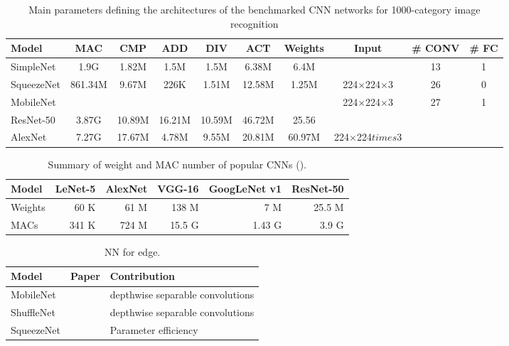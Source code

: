 \begin{table}
\renewcommand{\arraystretch}{.75}
\small
\centering
\caption{Main parameters defining the architectures of the benchmarked CNN networks for 1000-category image recognition \cite{Montero2018}\cite{Hasanpour2016}}
\begin{tabular}{lccccccccc}
\toprule
\textbf{Model}	&	\textbf{MAC}	&	\textbf{CMP}	&	\textbf{ADD}	&	\textbf{DIV}	&	\textbf{ACT}	&	\textbf{Weights}	&	\textbf{Input}	&	\textbf{\# CONV}	&	\textbf{\# FC}	\\
\midrule
SimpleNet	&	1.9G	&	1.82M	&	1.5M	&	1.5M	&	6.38M	&	6.4M	&		&	13	&	1 \\
SqueezeNet	&861.34M	&	9.67M	&	226K	&	1.51M	&	12.58M	&	1.25M	&	224$\times$224$\times$3 &	26	&	0	\\
MobileNet	&			&			&			&			&			&			&	224$\times$224$\times$3	&	27	&	1	\\
ResNet-50	&	3.87G	&	10.89M	&	16.21M	&	10.59M	&	46.72M	&	25.56&	\\
AlexNet		&	7.27G	&	17.67M	&	4.78M	&	9.55M	&	20.81M	&	60.97M	&	224$\times$224$
times$3 \\
\bottomrule
\end{tabular}
\end{table}



\begin{table}
\renewcommand{\arraystretch}{.75}
\centering
\caption{ Summary of weight and MAC number of popular CNNs (\cite{Sze2017}).}
\begin{tabular}{lrrrrr}
\toprule
\textbf{Model} & \textbf{LeNet-5} &  \textbf{AlexNet} & \textbf{VGG-16} & \textbf{GoogLeNet v1} & \textbf{ResNet-50} \\
\midrule
Weights	&	60 K	&	61 M	&	138 M	&	7 M	&	25.5 M \\
MACs	&	341 K	&	724 M	&	15.5 G	&	1.43 G	&	3.9 G \\
\bottomrule
\end{tabular}
\end{table}





\begin{table}
\renewcommand{\arraystretch}{.75}
\centering
\caption{NN for edge.}
\begin{tabular}{lcl}
\toprule
\textbf{Model} & \textbf{Paper} &  \textbf{Contribution} \\
\midrule
MobileNet & \cite{Howard2017} & depthwise separable convolutions \\
ShuffleNet & \cite{Zhang2018}   & depthwise separable convolutions \\
SqueezeNet & \cite{Iandola2017} & Parameter efficiency \\
\bottomrule
\end{tabular}
\end{table}



